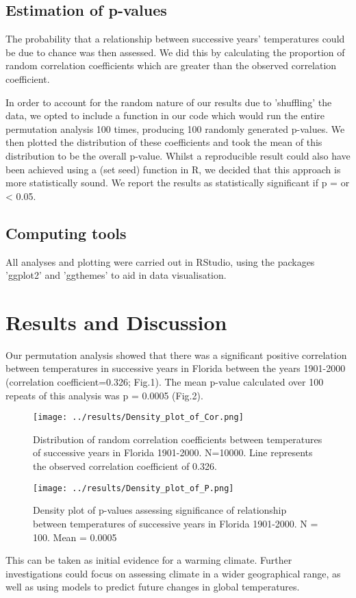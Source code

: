 \documentclass{article}
\begin{document}
	\subsection{Estimation of p-values}
	
	The probability that a relationship between successive years' temperatures could be due to chance was then assessed. We did this by calculating the proportion of random correlation coefficients which are greater than the observed correlation coefficient.
	
	In order to account for the random nature of our results due to 'shuffling' the data, we opted to include a function in our code which would run the entire permutation analysis 100 times, producing 100 randomly generated p-values. We then plotted the distribution of these coefficients and took the mean of this distribution to be the overall p-value. Whilst a reproducible result could also have been achieved using a (set seed) function in R, we decided that this approach is more statistically sound. We report the results as statistically significant if p = or < 0.05.
	
	
	\subsection{Computing tools}
	All analyses and plotting were carried out in RStudio, using the packages 'ggplot2' and 'ggthemes' to aid in data visualisation.
	
	\section{Results and Discussion}
	
	Our permutation analysis showed that there was a significant positive correlation between temperatures in successive years in Florida between the years 1901-2000 (correlation coefficient=0.326; Fig.1). The mean p-value calculated over 100 repeats of this analysis was p = 0.0005 (Fig.2).
	
	\begin{figure}[H]
		\centering
		\texttt{[image: ../results/Density\_plot\_of\_Cor.png]}
		\caption{Distribution of random correlation coefficients between temperatures of successive years in Florida 1901-2000. N=10000. Line represents the observed correlation coefficient of 0.326.}
		\label{fig:my_label}
	\end{figure}
	
	\begin{figure}[H]
		\centering
		\texttt{[image: ../results/Density\_plot\_of\_P.png]}
		\caption{Density plot of p-values assessing significance of relationship between temperatures of successive years in Florida 1901-2000. N = 100. Mean = 0.0005}
		\label{fig:my_label}
	\end{figure}
	
	This can be taken as initial evidence for a warming climate. Further investigations could focus on assessing climate in a wider geographical range, as well as using models to predict future changes in global temperatures.
	
\end{document}
